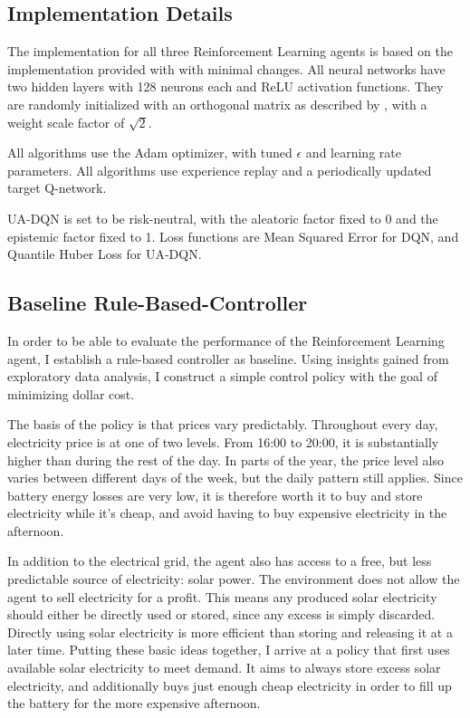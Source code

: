 \subsection{Implementation Details}
The implementation for all three Reinforcement Learning agents is based on the implementation provided with \cite{clements2020EstimatingRiskUncertainty} with minimal changes.
All neural networks have two hidden layers with 128 neurons each and ReLU activation functions.
They are randomly initialized with an orthogonal matrix as described by \cite{saxe2014ExactSolutionsNonlinear}, with a weight scale factor of $\sqrt{2}$.

All algorithms use the Adam optimizer, with tuned $\epsilon$ and learning rate parameters.
All algorithms use experience replay and a periodically updated target Q-network.

UA-DQN is set to be risk-neutral, with the aleatoric factor fixed to 0 and the epistemic factor fixed to 1.
Loss functions are Mean Squared Error for DQN, and Quantile Huber Loss for UA-DQN.

\subsection{Baseline Rule-Based-Controller}
In order to be able to evaluate the performance of the Reinforcement Learning agent, I establish a rule-based controller as baseline.
Using insights gained from exploratory data analysis, I construct a simple control policy with the goal of minimizing dollar cost.

The basis of the policy is that prices vary predictably.
Throughout every day, electricity price is at one of two levels.
From 16:00 to 20:00, it is substantially higher than during the rest of the day.
In parts of the year, the price level also varies between different days of the week, but the daily pattern still applies.
Since battery energy losses are very low, it is therefore worth it to buy and store electricity while it's cheap, and avoid having to buy expensive electricity in the afternoon.

In addition to the electrical grid, the agent also has access to a free, but less predictable source of electricity: solar power.
The environment does not allow the agent to sell electricity for a profit.
This means any produced solar electricity should either be directly used or stored, since any excess is simply discarded.
Directly using solar electricity is more efficient than storing and releasing it at a later time.
Putting these basic ideas together, I arrive at a policy that first uses available solar electricity to meet demand.
It aims to always store excess solar electricity, and additionally buys just enough cheap electricity in order to fill up the battery for the more expensive afternoon.

